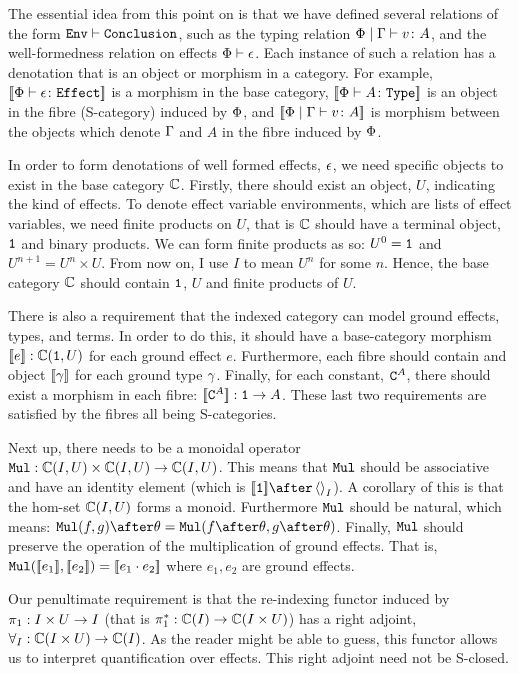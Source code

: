 \documentclass{Report}
\begin{document}
The essential idea from this point on is that we have defined several relations of the form $\wellformed{\texttt{Env}}{\texttt{Conclusion}}$, such as the typing relation $\gpetyperelation{v}{A}$, and the well-formedness relation on effects $\wellformed{\P}{\e}$. Each instance of such a relation has a denotation that is an object or morphism in a category. For example, $\deno{\typerelation{\P}{\e}{\effect}}$ is a morphism in the base category, $\deno{\typerelation{\P}{A}{\type}}$ is an object in the fibre (S-category) induced by $\P$, and $\deno{\gpetyperelation{v}{A}}$ is morphism between the objects which denote $\G$ and $A$ in the fibre induced by $\P$.

In order to form denotations of well formed effects, $\e$, we need specific objects to exist in the base category $\C$. Firstly, there should exist an object, $U$, indicating the kind of effects. To denote effect variable environments, which are lists of effect variables, we need finite products on $U$, that is $\C$ should have a terminal object, $\1$ and binary products. We can form finite products as so: $U^0 = \1$ and $U^{n+1} = U^n\times U$. From now on, I use $I$ to mean $U^n$ for some $n$. Hence, the base category $\C$ should contain $\1$, $U$ and finite products of $U$.

There is also a requirement that the indexed category can model ground effects, types, and terms. In order to do this, it should have a base-category morphism $\deno{e}: \C(\1, U)$ for each ground effect $e$. Furthermore, each fibre should contain and object $\deno{\g}$ for each ground type $\g$. Finally, for each constant, $\const{A}$, there should exist a morphism in each fibre: $\deno{\const{A}}: \1 \rightarrow A$. These last two requirements are satisfied by the fibres all being S-categories.

Next up, there needs to be a monoidal operator $\Mul: \ciu \times \ciu \rightarrow \ciu$. This means that $\Mul$ should be associative and have an identity element (which is $\deno{\1}\after\term{I}$). A corollary of this is that the hom-set $\C(I, U)$ forms a monoid. Furthermore $\Mul$ should be natural, which means: $\Mul(f, g)\after\theta = \Mul(f\after\theta, g\after\theta)$. Finally, $\Mul$ should preserve the operation of the multiplication of ground effects. That is, $\Mul(\deno{e_1},\deno{e_2}) = \deno{e_1\dot e_2}$ where $e_1, e_2$ are ground effects.

Our penultimate requirement is that the re-indexing functor  induced by $\p: I\times U\rightarrow I$ (that is $\pstar: \C(I) \rightarrow \C(I\times U)$) has a right adjoint, $\allI: \C(I\times U) \rightarrow \C(I)$. As the reader might be able to guess, this functor allows us to interpret quantification over effects. This right adjoint need not be S-closed.
\end{document}
